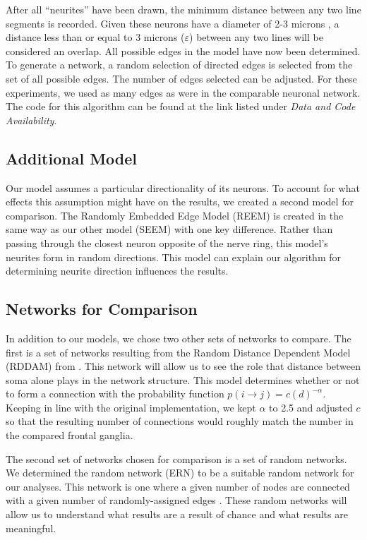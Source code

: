 After all ``neurites'' have been drawn, the minimum distance between any two line segments is recorded. 
Given these neurons have a diameter of 2-3 microns \citep{Schafer}, a distance less than or equal to 3 microns ($\varepsilon$) between any two lines will be considered an overlap. 
All possible edges in the model have now been determined. 
To generate a network, a random selection of directed edges is selected from the set of all possible edges. 
The number of edges selected can be adjusted. 
For these experiments, we used as many edges as were in the comparable \ce neuronal network. 
The code for this algorithm can be found at the link listed under \textit{Data and Code Availability}.

\subsection{Additional Model}

Our model assumes a particular directionality of its neurons.
To account for what effects this assumption might have on the results, we created a second model for comparison. 
The Randomly Embedded Edge Model (REEM) is created in the same way as our other model (SEEM) with one key difference. 
Rather than passing through the closest neuron opposite of the nerve ring, this model's neurites form in random directions.
This model can explain our algorithm for determining neurite direction influences the results.

\subsection{Networks for Comparison}
In addition to our models, we chose two other sets of networks to compare. 
The first is a set of networks resulting from the Random Distance Dependent Model (RDDAM) from \cite{Itzhack}. 
This network will allow us to see the role that distance between soma alone plays in the network structure.
This model determines whether or not to form a connection with the probability function $p(i \rightarrow j)= c(d)^{- \alpha}$. 
Keeping in line with the original implementation, we kept $\alpha$ to 2.5 and adjusted $c$ so that the resulting number of connections would roughly match the number in the compared \ce frontal ganglia.

The second set of networks chosen for comparison is a set of random networks. 
We determined the \er random network (ERN) to be a suitable random network for our analyses.
This network is one where a given number of nodes are connected with a given number of randomly-assigned edges \citep{Erdos}.
These random networks will allow us to understand what results are a result of chance and what results are meaningful.

